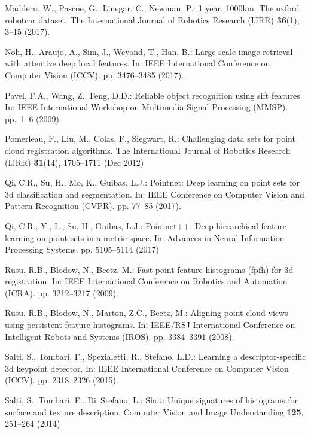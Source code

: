 \documentclass[runningheads]{llncs}
\begin{document}
\begin{thebibliography}{10}
Maddern, W., Pascoe, G., Linegar, C., Newman, P.: 1 year, 1000km: The oxford
  robotcar dataset. The International Journal of Robotics Research (IJRR)
  \textbf{36}(1),  3--15 (2017). 

Noh, H., Araujo, A., Sim, J., Weyand, T., Han, B.: Large-scale image retrieval
  with attentive deep local features. In: IEEE International Conference on
  Computer Vision (ICCV). pp. 3476--3485 (2017). 

Pavel, F.A., Wang, Z., Feng, D.D.: Reliable object recognition using sift
  features. In: IEEE International Workshop on Multimedia Signal Processing
  (MMSP). pp.~1--6 (2009). 

Pomerleau, F., Liu, M., Colas, F., Siegwart, R.: Challenging data sets for
  point cloud registration algorithms. The International Journal of Robotics
  Research (IJRR)  \textbf{31}(14),  1705--1711 (Dec 2012)

Qi, C.R., Su, H., Mo, K., Guibas, L.J.: Pointnet: Deep learning on point sets
  for 3d classification and segmentation. In: IEEE Conference on Computer
  Vision and Pattern Recognition (CVPR). pp. 77--85 (2017).

Qi, C.R., Yi, L., Su, H., Guibas, L.J.: Pointnet++: Deep hierarchical feature
  learning on point sets in a metric space. In: Advances in Neural Information
  Processing Systems. pp. 5105--5114 (2017)

Rusu, R.B., Blodow, N., Beetz, M.: Fast point feature histograms (fpfh) for 3d
  registration. In: IEEE International Conference on Robotics and Automation
  (ICRA). pp. 3212--3217 (2009). 

Rusu, R.B., Blodow, N., Marton, Z.C., Beetz, M.: Aligning point cloud views
  using persistent feature histograms. In: IEEE/RSJ International Conference on
  Intelligent Robots and Systems (IROS). pp. 3384--3391 (2008).

Salti, S., Tombari, F., Spezialetti, R., Stefano, L.D.: Learning a
  descriptor-specific 3d keypoint detector. In: IEEE International Conference
  on Computer Vision (ICCV). pp. 2318--2326 (2015). 

Salti, S., Tombari, F., Di~Stefano, L.: Shot: Unique signatures of histograms
  for surface and texture description. Computer Vision and Image Understanding
  \textbf{125},  251--264 (2014)


\end{thebibliography}
\end{document}
